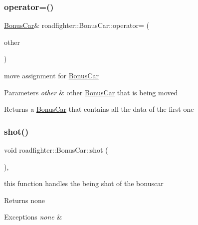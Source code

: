 \subsubsection{\texorpdfstring{operator=()}{operator=()}\hspace{0.1cm}{\footnotesize\ttfamily [2/2]}}
{\footnotesize\ttfamily \hyperlink{classroadfighter_1_1BonusCar}{Bonus\+Car}\& roadfighter\+::\+Bonus\+Car\+::operator= (\begin{DoxyParamCaption}\item[{\hyperlink{classroadfighter_1_1BonusCar}{Bonus\+Car} \&\&}]{other }\end{DoxyParamCaption})\hspace{0.3cm}{\ttfamily [default]}}

move assignment for \hyperlink{classroadfighter_1_1BonusCar}{Bonus\+Car} 
\begin{DoxyParams}{Parameters}
{\em other} & other \hyperlink{classroadfighter_1_1BonusCar}{Bonus\+Car} that is being moved \\
\hline
\end{DoxyParams}
\begin{DoxyReturn}{Returns}
a \hyperlink{classroadfighter_1_1BonusCar}{Bonus\+Car} that contains all the data of the first one 
\end{DoxyReturn}
\mbox{\label{classroadfighter_1_1BonusCar_a02edcd22a86c1f98642c3703ef8dfb16}} 
\subsubsection{\texorpdfstring{shot()}{shot()}}
{\footnotesize\ttfamily void roadfighter\+::\+Bonus\+Car\+::shot (\begin{DoxyParamCaption}{ }\end{DoxyParamCaption})\hspace{0.3cm}{\ttfamily [override]}, {\ttfamily [virtual]}}

this function handles the being shot of the bonuscar \begin{DoxyReturn}{Returns}
none 
\end{DoxyReturn}

\begin{DoxyExceptions}{Exceptions}
{\em none} & \\
\hline
\end{DoxyExceptions}


